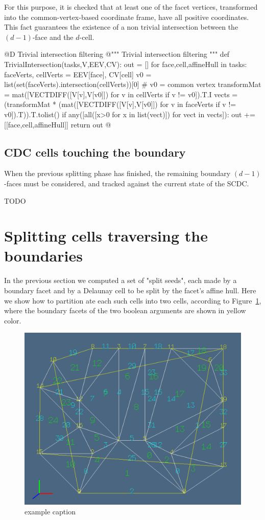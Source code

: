 \documentclass[11pt,oneside]{article}	%
\begin{document}
For this purpose, it is checked that at least one of the facet vertices, transformed into the common-vertex-based coordinate frame, have all positive coordinates. This fact guarantees the existence of a non trivial intersection between the $(d-1)$-face and the $d$-cell.

@D Trivial intersection filtering
@{""" Trivial intersection filtering """
def TrivialIntersection(tasks,V,EEV,CV):
	out = []
	for face,cell,affineHull in tasks:
		faceVerts, cellVerts = EEV[face], CV[cell]
		v0 = list(set(faceVerts).intersection(cellVerts))[0] # v0 = common vertex
		transformMat = mat([VECTDIFF([V[v],V[v0]]) for v in cellVerts if v != v0]).T.I
		vects = (transformMat * (mat([VECTDIFF([V[v],V[v0]]) for v in faceVerts 
					if v != v0]).T)).T.tolist()
		if any([all([x>0 for x in list(vect)]) for vect in vects]): 
			out += [[face,cell,affineHull]]
	return out
@}

\subsection{CDC cells touching the boundary}

When the previous splitting phase has finished, the remaining boundary $(d-1)$-faces must be considered, and tracked against the current state of the SCDC.

TODO

\section{Splitting cells traversing the boundaries}

In the previous section we computed a set of "split seeds", each made by a boundary facet and by a Delaunay cell to be split by the facet's affine hull. Here we show how to partition ate each such cells into two cells, according to Figure~\ref{fig:splitting}, where the boundary facets of the two boolean arguments are shown in yellow color.

\begin{figure}[htbp] %
   \centering
   \includegraphics[width=0.6\linewidth]{images/splitting} 
   \caption{example caption}
   \label{fig:splitting}
\end{figure}
\end{document}
